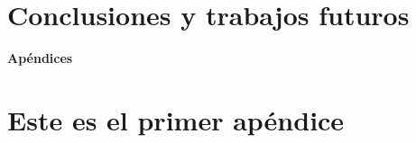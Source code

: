 \documentclass[12pt,twoside,titlepage]{report}
\newcommand\blankpage{%
    \newpage
    \null
    \thispagestyle{empty}%
    \newpage}
\begin{document}


\blankpage


\chapter{Conclusiones y trabajos futuros}



\blankpage



{}

\footnotesize{
%


}



\raggedbottom
\afterpage{\blankpage}

\newpage





\appendix

{}

\mbox{}
\vfill
\begin{center}
\begin{Huge}
\textbf{Apéndices}
\end{Huge}
\end{center}
\vfill
\mbox{}
\thispagestyle{empty}

\newpage
\mbox{}
\thispagestyle{empty}
\newpage


\chapter{Este es el primer apéndice}
\label{sec:apendice}



\end{document}
